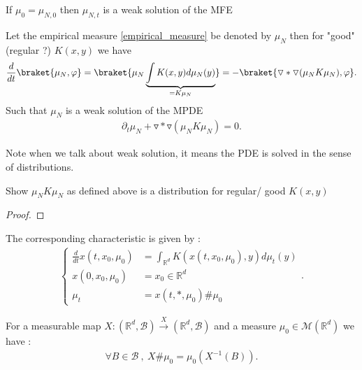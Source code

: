 \begin{remark}
  If $\mu_0 = \mu_{N,0}$  then $\mu_{N,t}$ is a weak solution of the MFE
\end{remark}
\begin{theorem}
Let the empirical measure \ref{empirical_measure} be denoted by $\mu_N$ then for "good" (regular ?)  $K(x,y)$ we have 
\begin{align*}
  \frac{d}{dt} \braket{\mu_N,\phi } = \braket{\mu_N \underbrace{\int K(x,y) d\mu_N(y)}_{=  K \mu_N}}= -\braket{\triangledown * \triangledown(\mu_N K\mu_N),\phi }
.\end{align*}
Such that $\mu_N$ is a weak solution of the MPDE
\begin{align*}
  \partial_t \mu_N + \triangledown * \triangledown(\mu_N K\mu_N) = 0
.\end{align*}  
\end{theorem}
\begin{remark}
 Note when we talk about weak solution, it means the PDE is solved in the sense of distributions.
\end{remark}
\begin{exercise}
 Show $\mu_N K \mu_N$ as defined above is a distribution for regular/ good $K(x,y)$
\end{exercise}
\begin{proof}  
\end{proof}
\begin{definition}\label{characteristic_problem}
  The corresponding characteristic is given by : 
\begin{align*}  
  \begin{cases}
    \frac{d}{dt} x(t,x_0,\mu_0) &= \int_{\mathbb{R}^{d } } K(x(t,x_0,\mu_0),y) d\mu_t(y)\\
    x(0,x_0,\mu_0) &= x_0 \in  \mathbb{R}^{d }  \\
    \mu_t &= x(t,*,\mu_0) \# \mu_0 
  \end{cases}
.\end{align*}
\end{definition}
\begin{notation}
  For a measurable map $X : (\mathbb{R}^{d },\mathcal{B} ) \xrightarrow{X} (\mathbb{R}^{d },\mathcal{B} )$
  and a measure  $\mu_0 \in \mathcal{M}(\mathbb{R}^{d } )$ we have : 
 \begin{align*}
     \forall B \in  \mathcal{B} \ , \ X \# \mu_0 = \mu_0(X^{-1}(B) ) 
 .\end{align*} 
\end{notation}
